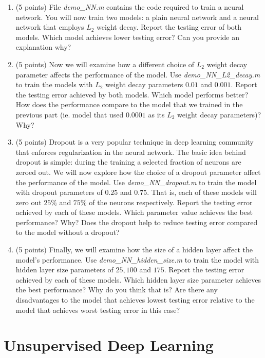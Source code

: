 \documentclass[english]{article}
\begin{document}
\begin{enumerate}
\item (5 points) File \textit{demo\_NN.m} contains the code required to train a neural network. You will now train two models: a plain neural network and a neural network that employs $L_2$ weight decay. Report the testing error of both models. Which model achieves lower testing error? Can you provide an explanation why?



\item (5 points) Now we will examine how a different choice of $L_2$ weight decay parameter affects the performance of the model. Use  \textit{demo\_NN\_L2\_decay.m} to train the models with $L_2$ weight decay parameters $0.01$ and $0.001$. Report the testing error achieved by both models. Which model performs better? How does the performance compare to the model that we trained in the previous part (ie. model that used $0.0001$ as its $L_2$ weight decay parameters)? Why?


\item (5 points) Dropout is a very popular technique in deep learning community that enforces regularization in the neural network. The basic idea behind dropout is simple: during the training a selected fraction of neurons are zeroed out. We will now explore how the choice of a dropout parameter affect the performance of the model. Use \textit{demo\_NN\_dropout.m} to train the model with dropout parameters of $0.25$ and $0.75$. That is, each of these models will zero out $25\%$ and $75\%$ of the neurons respectively. Report the testing error achieved by each of these models. Which parameter value achieves the best performance? Why? Does the dropout help to reduce testing error compared to the model without a dropout?


\item (5 points) Finally, we will examine how the size of a hidden layer affect the model's performance. Use \textit{demo\_NN\_hidden\_size.m} to train the model with hidden layer size parameters of $25, 100$ and $175$. Report the testing error achieved by each of these models. Which hidden layer size parameter achieves the best performance? Why do you think that is? Are there any disadvantages to the model that achieves lowest testing error relative to the model that achieves worst testing error in this case?

\end{enumerate}

\section{Unsupervised Deep Learning }
\label{sec:udl}
\end{document}
